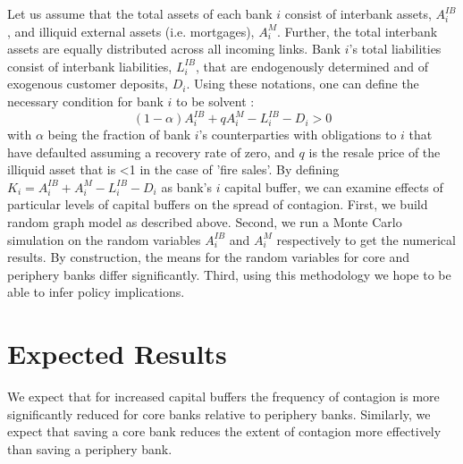 \documentclass[12pt,a4paper,oneside]{article} %
\begin{document}
Let us assume that the total assets of each bank $i$ consist of
interbank assets, $A_i^{IB}$, and illiquid external assets
(i.e. mortgages), $A_i^M$. Further, the total interbank assets are
equally distributed across all incoming links. Bank $i$'s total
liabilities consist of interbank liabilities, $L_i^{IB}$, that are
endogenously determined and of exogenous customer deposits,
$D_i$. Using these notations, one can define the necessary condition
for bank $i$ to be solvent \citep{Gai2010}:
\begin{equation}
(1-\alpha)A_i^{IB}+qA_i^M-L_i^{IB}-D_i>0
\end{equation} 
with $\alpha$ being the fraction of bank $i$'s counterparties with
obligations to $i$ that have defaulted assuming a recovery rate of
zero, and $q$ is the resale price of the illiquid asset that is <1 in
the case of 'fire sales'. By defining
$K_i=A_i^{IB}+A_i^M-L_i^{IB}-D_i$ as bank's $i$ capital buffer, we can
examine effects of particular levels of capital buffers on the spread
of contagion.
First, we build random graph model as described above. Second, we run
a Monte Carlo simulation on the random variables $A_i^{IB}$ and
$A_i^{M}$ respectively to get the numerical results. By construction, the means for the random
variables for core and periphery banks differ significantly. Third,
using this methodology we hope to be able to infer policy implications.

\section*{Expected Results}
We expect that for increased capital buffers the frequency of
contagion is more significantly reduced for core banks relative to
periphery banks. Similarly, we expect that saving a core bank reduces the extent of contagion more effectively than saving a periphery bank.  


 




\end{document}
